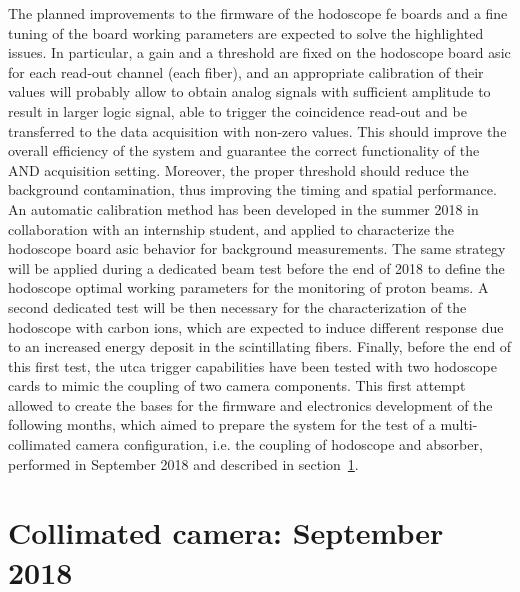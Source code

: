 The planned improvements to the firmware of the hodoscope \gls{fe} boards and a fine tuning of the board working parameters are expected to solve the highlighted issues. In particular, a gain and a threshold are fixed on the hodoscope board \gls{asic} for each read-out channel (each fiber), and an appropriate calibration of their values will probably allow to obtain analog signals with sufficient amplitude to result in larger logic signal, able to trigger the coincidence read-out and be transferred to the data acquisition with non-zero values. This should improve the overall efficiency of the system and guarantee the correct functionality of the AND acquisition setting. Moreover, the proper threshold should reduce the background contamination, thus improving the timing and spatial performance.  
An automatic calibration method has been developed in the summer 2018 in collaboration with an internship student, and applied to characterize the hodoscope board \gls{asic} behavior for background measurements. The same strategy will be applied during a dedicated beam test before the end of 2018 to define the hodoscope optimal working parameters for the monitoring of proton beams. A second dedicated test will be then necessary for the characterization of the hodoscope with carbon ions, which are expected to induce different response due to an increased energy deposit in the scintillating fibers.   
Finally, before the end of this first test, the \gls{utca} trigger capabilities have been tested with two hodoscope cards to mimic the coupling of two camera components. This first attempt allowed to create the bases for the firmware and electronics development of the following months, which aimed to prepare the system for the test of a multi-collimated camera configuration, i.e. the coupling of hodoscope and absorber, performed in September 2018 and described in section~\ref{chap6::sec::september2018}. 


\section{Collimated camera: September 2018}\label{chap6::sec::september2018}

